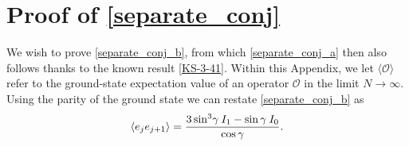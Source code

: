 \documentclass[a4paper,10pt]{article}
\newcommand{\linnea}[1]{$\framebox{\tiny L}$\ \textbf{\texttt{{\color{red}\footnotesize#1}}}}
\newcommand{\jesper}[1]{$\framebox{\tiny J}$\ \textbf{\texttt{{\color{cyan}\footnotesize#1}}}}
\begin{document}

\FloatBarrier



\newpage
\section{Proof of \eqref{separate_conj}}\label{Proof_Appendix}

We wish to prove \eqref{separate_conj_b}, from which \eqref{separate_conj_a} then also follows thanks to the known result \eqref{KS-3-41}. 
Within this Appendix, we let $\langle \mathcal{O}\rangle$ refer to the ground-state expectation value of an operator $\mathcal{O}$ in the limit $N\to\infty$. Using the parity of the ground state we can restate \eqref{separate_conj_b} as
\begin{equation}
 \langle e_je_{j+1} \rangle = {3\sin^3 \! \gamma \: I_1-\sin\gamma \: I_0\over \cos\gamma}.
\end{equation}
\end{document}
